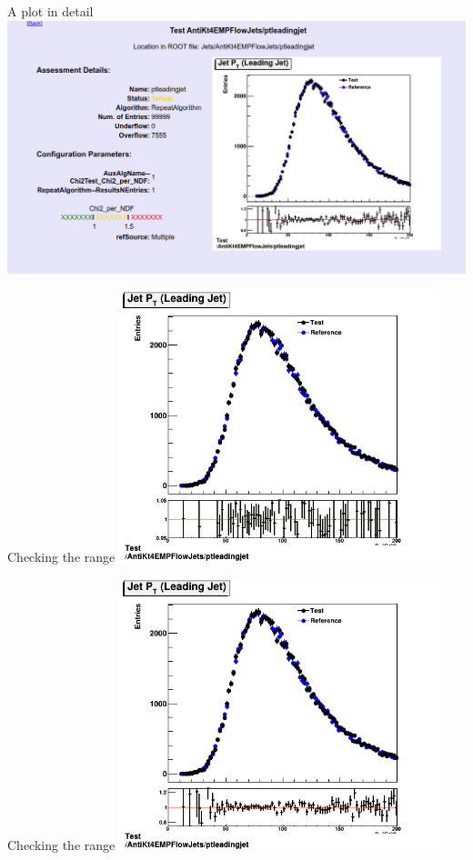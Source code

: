 %
\begin{frame}{A plot in detail}
    \centering \includegraphics[width=\textwidth]{details.png}
\end{frame}
%
\begin{frame}{Checking the range}
    \centering \includegraphics[width=0.7\textwidth]{smallRange.png}
\end{frame}
%
\begin{frame}{Checking the range}
    \centering \includegraphics[width=0.7\textwidth]{largeRange.png}
\end{frame}

